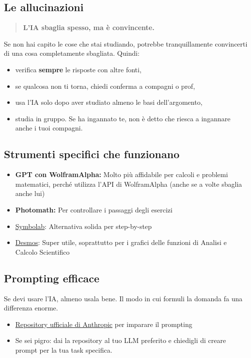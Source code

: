 \documentclass{article}
\begin{document}
\subsection{Le allucinazioni}
\begin{quote}
\textbf{L'IA sbaglia spesso, ma è convincente.}
\end{quote}
Se non hai capito le cose che stai studiando, potrebbe tranquillamente convincerti di una cosa completamente sbagliata. Quindi:
\begin{itemize}
\item verifica \textbf{sempre} le risposte con altre fonti,
\item se qualcosa non ti torna, chiedi conferma a compagni o prof,
\item usa l'IA solo dopo aver studiato almeno le basi dell'argomento,
\item studia in gruppo. Se ha ingannato te, non è detto che riesca a ingannare anche i tuoi compagni.
\end{itemize}


\subsection{Strumenti specifici che funzionano}
\begin{itemize}
\item \textbf{GPT con WolframAlpha:} Molto più affidabile per calcoli e problemi matematici, perché utilizza l'API di WolframAlpha (anche se a volte sbaglia anche lui)
\item \textbf{Photomath:} Per controllare i passaggi degli esercizi
\item \href{https://it.symbolab.com/}{Symbolab}: Alternativa solida per step-by-step
\item \href{https://www.desmos.com/calculator?lang=it}{Desmos}: Super utile, soprattutto per i grafici delle funzioni di Analisi e Calcolo Scientifico
\end{itemize}


\subsection{Prompting efficace}
Se devi usare l'IA, almeno usala bene. Il modo in cui formuli la domanda fa una differenza enorme.
\begin{itemize}
\item \href{https://github.com/anthropics/prompt-eng-interactive-tutorial}{Repository ufficiale di Anthropic} per imparare il prompting
\item Se sei pigro: dai la repository al tuo LLM preferito e chiedigli di creare prompt per la tua task specifica.
\end{itemize}
\end{document}
